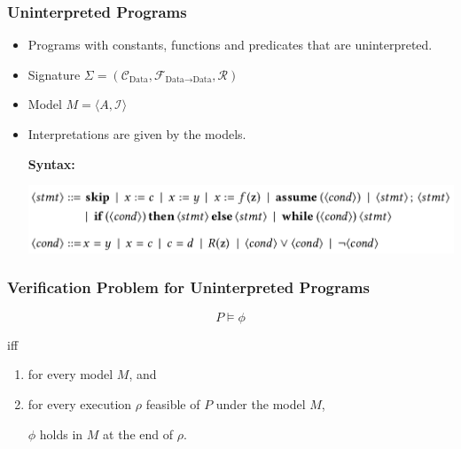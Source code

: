 \documentclass[aspectratio=1610, 13pt]{beamer}
\begin{document}
\begin{frame}\frametitle{Uninterpreted Programs}

\begin{itemize}
\item Programs with constants, functions and predicates that are uninterpreted.
\item Signature $\Sigma = (\mathcal{C}_{\text{Data}}, \mathcal{F}_{\text{Data}\rightarrow \text{Data}}, \mathcal{R})$
\item Model $M = \langle A, \mathcal{I}\rangle$


\item Interpretations are given by the models.

\textbf{Syntax:}

\begin{center}
\includegraphics[scale=0.36]{syntax.png}
\end{center}
\end{itemize}
\end{frame}

\begin{frame}\frametitle{Verification Problem for Uninterpreted Programs}
\[P\models \phi\]

iff

\begin{enumerate}
\item for every model $M$, and 
\item for every execution $\rho$ feasible of $P$ under the model $M$,

$\phi$ holds in $M$ at the end of $\rho$.

\end{enumerate}

\end{frame}
\end{document}
